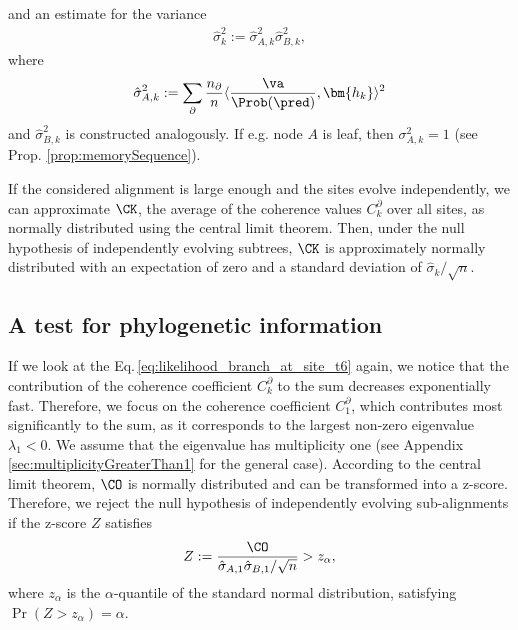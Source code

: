      and an estimate for the variance
    \begin{align}
        \hat{\sigma}^2_k := \hat{\sigma}^2_{A,k} \hat{\sigma}^2_{B,k}, \label{eq:varCK}
    \end{align}
    where
    \begin{align*}
        \hat{\sigma}^2_{A,k} := \sum_\partial \frac{n_{\partial}}{n} \langle \frac{\va}{\Prob(\pred)},  \bm{h_k}\rangle^2
    \end{align*}
and $\hat{\sigma}^2_{B,k}$ is constructed analogously.
If e.g. node $A$ is leaf, then $\sigma^2_{A,k} = 1$ (see Prop. \ref{prop:memorySequence}).



\medskip 
If the considered alignment is large enough and the sites evolve independently, we can approximate $\CK$, the average of the coherence values $C^\partial_k$  over all sites, as normally distributed using the central limit theorem. Then, under the null hypothesis of independently evolving subtrees, $\CK$ is approximately normally distributed with an expectation of zero and a standard deviation of $\hat\sigma_k/\sqrt{n}$.


\subsection{A test for phylogenetic information}\label{msec:test}

\medskip
If we look at the Eq.\,\eqref{eq:likelihood_branch_at_site_t6} again, we notice that the contribution of the coherence coefficient $C^\partial_k$ to the sum decreases exponentially fast. Therefore, we focus on  the coherence coefficient $C^\partial_1$, which contributes most significantly to the sum, as it corresponds to the largest non-zero eigenvalue $\lambda_1 < 0$. We assume that the eigenvalue has  multiplicity one (see Appendix \ref{sec:multiplicityGreaterThan1} for the general case). According to the central limit theorem, $\CO$ is normally distributed and can be transformed into a z-score. Therefore, we reject the null hypothesis of independently evolving sub-alignments if the z-score $Z$ satisfies
\begin{equation} \label{eq:th_zscore}
Z := \frac{\CO}{\hat{\sigma}_{A,1} \hat{\sigma}_{B,1}/\sqrt{n}} > z_\alpha,
\end{equation}
where $z_\alpha$ is the $\alpha$-quantile of the standard normal distribution, satisfying $\Pr(Z > z_\alpha) = \alpha$.


